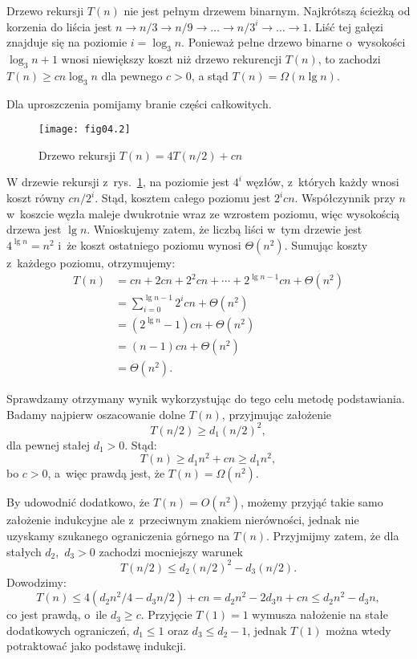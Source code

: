 \exercise %
Drzewo rekursji $T(n)$ nie jest pełnym drzewem binarnym. Najkrótszą ścieżką od korzenia do liścia jest $n\to n/3\to n/9\to\dots\to n/3^i\to\dots\to1$. Liść tej gałęzi znajduje się na poziomie $i=\log_3n$. Ponieważ pełne drzewo binarne o~wysokości $\log_3n+1$ wnosi niewiększy koszt niż drzewo rekurencji $T(n)$, to zachodzi $T(n)\ge cn\log_3n$ dla pewnego $c>0$, a stąd $T(n)=\Omega(n\lg n)$.

\exercise %
Dla uproszczenia pomijamy branie części całkowitych.
\begin{figure}[ht]
	\begin{center}
		\texttt{[image: fig04.2]}
	\end{center}
	\caption{Drzewo rekursji $T(n)=4T(n/2)+cn$} \label{fig:4.2-3}
\end{figure}
W drzewie rekursji z~rys.~\ref{fig:4.2-3}, na  poziomie jest $4^i$ węzłów, z~których każdy wnosi koszt równy $cn/2^i$. Stąd, kosztem całego poziomu jest $2^icn$. Współczynnik przy $n$ w~koszcie węzła maleje dwukrotnie wraz ze wzrostem poziomu, więc wysokością drzewa jest $\lg n$. Wnioskujemy zatem, że liczbą liści w~tym drzewie jest $4^{\lg n}=n^2$ i~że koszt ostatniego poziomu wynosi $\Theta(n^2)$. Sumując koszty z~każdego poziomu, otrzymujemy:
\begin{align*}
	T(n) &= cn+2cn+2^2cn+\cdots+2^{\lg n-1}cn+\Theta(n^2) \\
	&= \sum_{i=0}^{\lg n-1}2^icn+\Theta(n^2) \\
	&= (2^{\lg n}-1)cn+\Theta(n^2) \\
	&= (n-1)cn+\Theta(n^2) \\
	&= \Theta(n^2).
\end{align*}

Sprawdzamy otrzymany wynik wykorzystując do tego celu metodę podstawiania. Badamy najpierw oszacowanie dolne $T(n)$, przyjmując założenie
\[
	T(n/2) \ge d_1(n/2)^2,
\]
dla pewnej stałej $d_1>0$. Stąd:
\[
	T(n) \ge d_1n^2+cn \ge d_1n^2, 
\]
bo $c>0$, a~więc prawdą jest, że $T(n)=\Omega(n^2)$.

By udowodnić dodatkowo, że $T(n)=O(n^2)$, możemy przyjąć takie samo założenie indukcyjne ale z~przeciwnym znakiem nierówności, jednak nie uzyskamy szukanego ograniczenia górnego na $T(n)$. Przyjmijmy zatem, że dla stałych $d_2$,~$d_3>0$ zachodzi mocniejszy warunek
\[
	T(n/2) \le d_2(n/2)^2-d_3(n/2).
\]
Dowodzimy:
\[
	T(n) \le 4(d_2n^2\!/4-d_3n/2)+cn = d_2n^2-2d_3n+cn \le d_2n^2-d_3n,
\]
co jest prawdą, o~ile $d_3\ge c$. Przyjęcie $T(1)=1$ wymusza nałożenie na stałe dodatkowych ograniczeń, $d_1\le1$ oraz $d_3\le d_2-1$, jednak $T(1)$ można wtedy potraktować jako podstawę indukcji.

